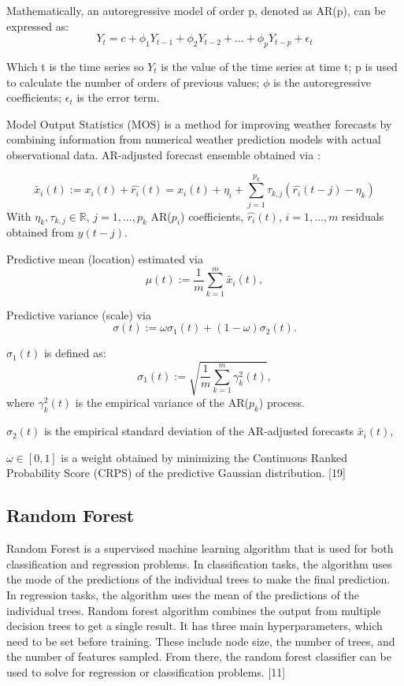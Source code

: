 \documentclass{ieeeojies}
\begin{document}
Mathematically, an autoregressive model of order p, denoted as AR(p), can be expressed as:
\begin{dmath*}
 Y_t = c + \phi_1 Y_{t-1} + \phi_2 Y_{t-2} +...+ \phi_p Y_{t-p} + \epsilon_t 
 \end{dmath*}

Which t is the time series so \(Y_t\) is the value of the time series at time t; p is used to calculate the number of orders of previous values; \(\phi\) is the autoregressive coefficients; \(\epsilon_t\) is the error term.

Model Output Statistics (MOS) is a method for improving weather forecasts by combining information from numerical weather prediction models with actual observational data. 
AR-adjusted forecast ensemble obtained via : 

\[\widetilde{x_i}(t) := x_i(t) + \widehat{r_i}(t) = x_i(t) + \eta_i + \sum_{j=1}^{p_k} \tau_{k,j} ( \widehat{r_i}(t - j) - \eta_k)
\]
With \(\eta_k, \tau_{k,j} \in \mathbb{R}\), \(j = 1, \ldots, p_k\) AR(\(p_i\)) coefficients, \(\widehat{r_i}(t)\),
\(i = 1, \ldots, m\) residuals obtained from \(y(t - j)\).

Predictive mean (location) estimated via
\[
\mu(t) := \frac{1}{m} \sum_{k=1}^{m} \widetilde{x_i}(t),
\]

Predictive variance (scale) via
\[
\sigma(t) := \omega \sigma_1(t) + (1 - \omega) \sigma_2(t).
\]

\(\sigma_1(t)\) is defined as:
\[
\sigma_1(t) := \sqrt{\frac{1}{m} \sum_{k=1}^{m} \gamma_k^2(t)},
\]
where \(\gamma_k^2(t)\) is the empirical variance of the AR(\(p_k\)) process.

\(\sigma_2(t)\) is the empirical standard deviation of the AR-adjusted forecasts \(\widetilde{x_i}(t)\),

\(\omega \in [0, 1]\) is a weight obtained by minimizing the Continuous Ranked Probability Score (CRPS) of the predictive Gaussian distribution. [19]

\subsection{Random Forest}
Random Forest is a supervised machine learning algorithm that is used for both classification and regression problems. In classification tasks, the algorithm uses the mode of the predictions of the individual trees to make the final prediction. In regression tasks, the algorithm uses the mean of the predictions of the individual trees. 
Random forest algorithm combines the output from multiple decision trees to get a single result. It has three main hyperparameters, which need to be set before training. These include node size, the number of trees, and the number of features sampled. From there, the random forest classifier can be used to solve for regression or classification problems. [11] 
\end{document}
